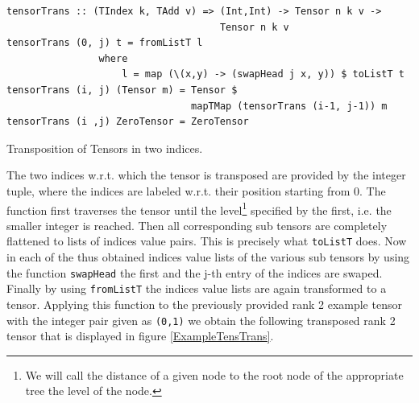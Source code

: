 \documentclass[a4paper,12pt, DIV=14, BCOR=5mm, twoside, headsepline, numbers=noenddot]{scrbook}
\begin{document}
\begin{listing}[hbt!]
\begin{verbatim}
tensorTrans :: (TIndex k, TAdd v) => (Int,Int) -> Tensor n k v ->
                                     Tensor n k v
tensorTrans (0, j) t = fromListT l
                where
                    l = map (\(x,y) -> (swapHead j x, y)) $ toListT t
tensorTrans (i, j) (Tensor m) = Tensor $
                                mapTMap (tensorTrans (i-1, j-1)) m
tensorTrans (i ,j) ZeroTensor = ZeroTensor
\end{verbatim}
\caption{Transposition of Tensors in two indices.}\label{TensorTrans}
\end{listing}

The two indices w.r.t. which the tensor is transposed are provided by the integer tuple, where the indices are labeled w.r.t. their position starting from 0. The function first traverses the tensor until the level\footnote{We will call the distance of a given node to the root node of the appropriate tree the level of the node.} specified by the first, i.e. the smaller integer is reached. Then all corresponding sub tensors are completely flattened to lists of indices value pairs. This is precisely what \texttt{toListT} does. Now in each of the thus obtained indices value lists of the various sub tensors by using the function \texttt{swapHead} the first and the j-th entry of the indices are swaped. Finally by using  \texttt{fromListT} the indices value lists are again transformed to a tensor.  Applying this function to the previously provided rank 2 example tensor with the integer pair given as \texttt{(0,1)} we obtain the following transposed rank 2 tensor that is displayed in figure \ref{ExampleTensTrans}.
\end{document}

